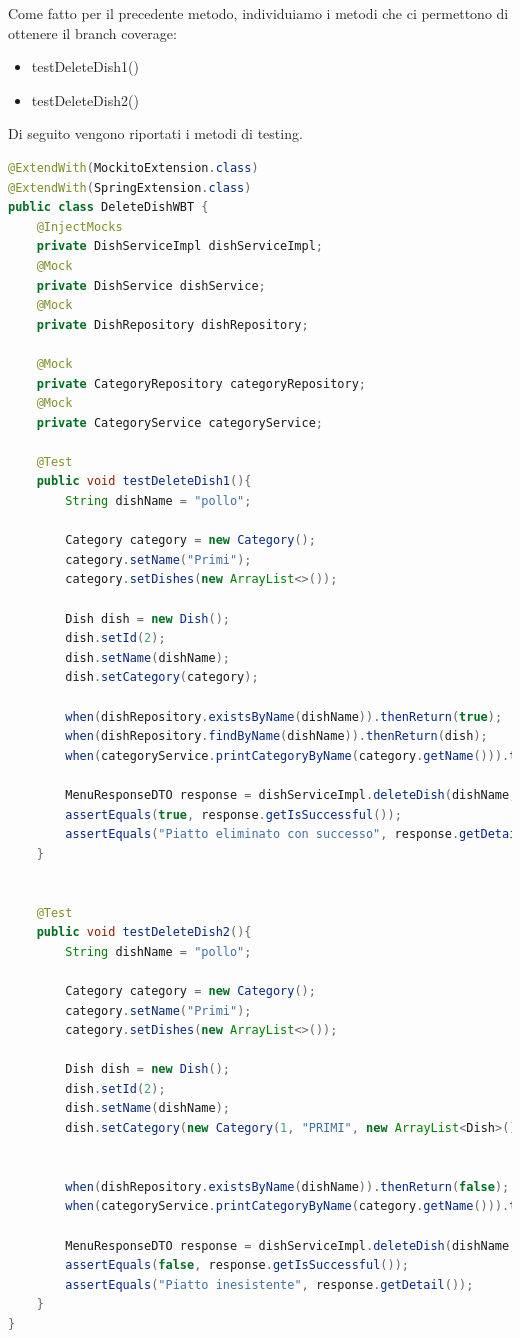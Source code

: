 Come fatto per il precedente metodo, individuiamo i metodi che ci permettono di ottenere il branch coverage:
\begin{itemize}
    \item testDeleteDish1()
    \item testDeleteDish2()
\end{itemize}
Di seguito vengono riportati i metodi di testing.
\begin{lstlisting}[language=java]
@ExtendWith(MockitoExtension.class)
@ExtendWith(SpringExtension.class)
public class DeleteDishWBT {
    @InjectMocks
    private DishServiceImpl dishServiceImpl;
    @Mock
    private DishService dishService;
    @Mock
    private DishRepository dishRepository;

    @Mock
    private CategoryRepository categoryRepository;
    @Mock
    private CategoryService categoryService;

    @Test
    public void testDeleteDish1(){
        String dishName = "pollo";

        Category category = new Category();
        category.setName("Primi");
        category.setDishes(new ArrayList<>());

        Dish dish = new Dish();
        dish.setId(2);
        dish.setName(dishName);
        dish.setCategory(category);

        when(dishRepository.existsByName(dishName)).thenReturn(true);
        when(dishRepository.findByName(dishName)).thenReturn(dish);
        when(categoryService.printCategoryByName(category.getName())).thenReturn(new MenuResponseDTO(new CategoryDishDTO(category.getDishes(), category), "Piatto eliminato con successo", true));

        MenuResponseDTO response = dishServiceImpl.deleteDish(dishName, category);
        assertEquals(true, response.getIsSuccessful());
        assertEquals("Piatto eliminato con successo", response.getDetail());
    }


    @Test
    public void testDeleteDish2(){
        String dishName = "pollo";

        Category category = new Category();
        category.setName("Primi");
        category.setDishes(new ArrayList<>());

        Dish dish = new Dish();
        dish.setId(2);
        dish.setName(dishName);
        dish.setCategory(new Category(1, "PRIMI", new ArrayList<Dish>()));


        when(dishRepository.existsByName(dishName)).thenReturn(false);
        when(categoryService.printCategoryByName(category.getName())).thenReturn(new MenuResponseDTO(new CategoryDishDTO(category.getDishes(), category), "Piatto inesistente", false));

        MenuResponseDTO response = dishServiceImpl.deleteDish(dishName, category);
        assertEquals(false, response.getIsSuccessful());
        assertEquals("Piatto inesistente", response.getDetail());
    }
}

\end{lstlisting}

